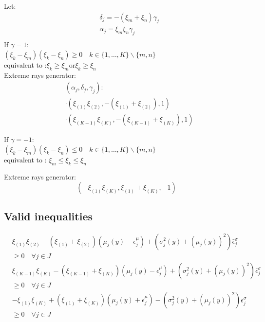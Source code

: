 \documentclass{beamer}
\begin{document}
\begin{frame} Let:
	\begin{equation}
		\begin{aligned}
		& \delta_j= -(\xi_m+\xi_n)\gamma_j \\
		& \alpha_j=\xi_m\xi_n\gamma_j\\
		\end{aligned}
	\end{equation}
	If $\gamma=1$:\\
	\quad$(\xi_k - \xi_m)(\xi_k-\xi_n)\geq0 \quad k \in\{1, \ldots, K\} \backslash\{m, n\}$\\
	\quad equivalent to :$\xi_k\geq\xi_m \text{or} \xi_k\geq\xi_n$\\
	Extreme rays generator:
	\begin{equation}
		\begin{aligned}
		& \left(\alpha_j, \delta_j, \gamma_j\right): \\
		& \cdot\left(\xi_{(1)} \xi_{(2)},-\left(\xi_{(1)}+\xi_{(2)}\right), 1\right) \\
		& \cdot\left(\xi_{(K-1)} \xi_{(K)},-\left(\xi_{(K-1)}+\xi_{(K)}\right), 1\right)
		\end{aligned}
	\end{equation}


	If $\gamma=-1$:\\
	\quad$(\xi_k - \xi_m)(\xi_k-\xi_n)\leq0 \quad k \in\{1, \ldots, K\} \backslash\{m, n\}$\\
	\quad equivalent to : $\xi_m\leq\xi_k\leq\xi_n$
	
	Extreme rays generator:\\
	\begin{equation}
		\left(-\xi_{(1)} \xi_{(K)}, \xi_{(1)}+\xi_{(K)},-1\right)
	\end{equation}
\end{frame}	

\subsection{Valid inequalities}
\begin{frame}
	\begin{equation}
		\begin{aligned}
		& \xi_{(1)} \xi_{(2)}-\left(\xi_{(1)}+\xi_{(2)}\right)\left(\mu_j(y)-\epsilon_j^\mu\right)+\left(\sigma_j^2(y)+\left(\mu_j(y)\right)^2\right) \bar{\epsilon}_j^\sigma \\
		& \geq 0 \quad \forall j \in J \\
		& \xi_{(K-1)} \xi_{(K)}-\left(\xi_{(K-1)}+\xi_{(K)}\right)\left(\mu_j(y)-\epsilon_j^\mu\right)+\left(\sigma_j^2(y)+\left(\mu_j(y)\right)^2\right) \bar{\epsilon}_j^\sigma \\
		& \geq 0 \quad \forall j \in J \\
		& -\xi_{(1)} \xi_{(K)}+\left(\xi_{(1)}+\xi_{(K)}\right)\left(\mu_j(y)+\epsilon_j^\mu\right)-\left(\sigma_j^2(y)+\left(\mu_j(y)\right)^2\right) \underline{\epsilon}_j^\sigma \\
		& \geq 0 \quad \forall j \in J
		\end{aligned}
	\end{equation}
\end{frame}	
\end{document}
